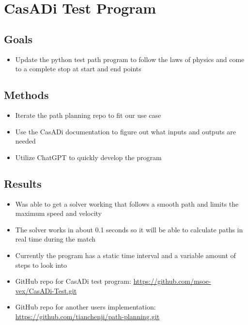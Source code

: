 \section{CasADi Test Program}

\subsection{Goals}
\begin{itemize}
    \item Update the python test path program to follow the laws of physics and come to a complete stop at start and end points
\end{itemize}

\subsection{Methods}
\begin{itemize}
    \item Iterate the path planning repo to fit our use case
    \item Use the CasADi documentation to figure out what inputs and outputs are needed
    \item Utilize ChatGPT to quickly develop the program
\end{itemize}

\subsection{Results}
\begin{itemize}
    \item Was able to get a solver working that follows a smooth path and limits the maximum speed and velocity
    \item The solver works in about 0.1 seconds so it will be able to calculate paths in real time during the match
    \item Currently the program has a static time interval and a variable amount of steps to look into
    \item GitHub repo for CasADi test program: \href{https://github.com/msoe-vex/CasADi-Test.git}{https://github.com/msoe-vex/CasADi-Test.git}
    \item GitHub repo for another users implementation: \href{https://github.com/tianchenji/path-planning.git}{https://github.com/tianchenji/path-planning.git}
\end{itemize}

